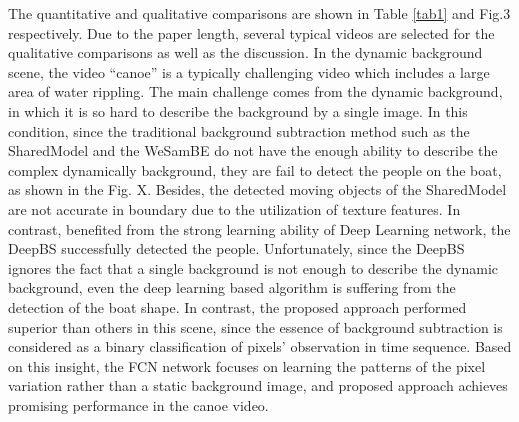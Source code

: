 \documentclass[journal]{IEEEtran}
\newcommand{\reftab}[1]{Table \ref{#1}}
\begin{document}
The quantitative and qualitative comparisons are shown in \reftab{tab1} and Fig.3 respectively. 
Due to the paper length, several typical videos are selected for the qualitative comparisons as well as the discussion. 
In the dynamic background scene, the video “canoe” is a typically challenging video which includes a large area of water rippling. 
The main challenge comes from the dynamic background, in which it is so hard to describe the background by a single image. 
In this condition, since the traditional background subtraction method such as the SharedModel and the WeSamBE do not have the enough ability to describe the complex dynamically background, they are fail to detect the people on the boat, as shown in the Fig. 
X. 
Besides, the detected moving objects of the SharedModel are not accurate in boundary due to the utilization of texture features. 
In contrast, benefited from the strong learning ability of Deep Learning network, the DeepBS successfully detected the people. 
Unfortunately, since the DeepBS ignores the fact that a single background is not enough to describe the dynamic background, even the deep learning based algorithm is suffering from the detection of the boat shape. 
In contrast, the proposed approach performed superior than others in this scene, since the essence of background subtraction is considered as a binary classification of pixels’ observation in time sequence. 
Based on this insight, the FCN network focuses on learning the patterns of the pixel variation rather than a static background image, and proposed approach achieves promising performance in the canoe video.
\end{document}
